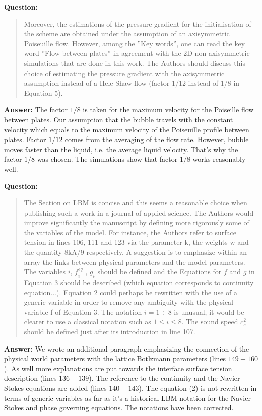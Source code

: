 \documentclass{article}
\begin{document}
\textbf{Question:}
\begin{quotation}
 Moreover, the estimations of the pressure gradient for the initialisation of the scheme are
obtained
under the assumption of an axisymmetric Poiseuille flow. However, among the ”Key words”, one can
read the key word ”Flow between plates” in agreement with the 2D non axisymmetric simulations
that are done in this work. The Authors should discuss this choice of estimating the pressure
gradient with the axisymmetric assumption instead of a Hele-Shaw flow (factor 1/12 instead of 1/8
in Equation 5).
\end{quotation}

\textbf{Answer:} The factor $1/8$ is taken for the maximum velocity for the Poiseille flow between
plates. Our assumption that the bubble travels with the constant velocity which equals to the
maximum velocity of the Poiseuille profile between plates. Factor $1/12$ comes from the averaging
of the flow rate. However, bubble moves faster than the liquid, i.e. the average liquid velocity.
That's why the factor $1/8$ was chosen. The simulations show that factor $1/8$ works reasonably
well.

\textbf{Question:}
\begin{quotation}
The Section on LBM is concise and this seems a reasonable choice when publishing such a work in a
journal of applied science. The Authors would improve signiﬁcantly the manuscript by defining more
rigorously some of the variables of the model. For instance, the Authors refer to surface tension in
lines 106, 111 and 123 via the parameter k, the weights w and the quantity 8kA/9 respectively.
A suggestion is to emphasize within an array the links between physical parameters and the model
parameters. The variables $i$, $f_i^{eq}$ , $g_i$ should be deﬁned and the Equations for $f$ and $g$
in Equation
3 should be described (which equation corresponds to continuity equation...). Equation 2 could
perhaps be rewritten with the use of a generic variable in order to remove any ambiguity with the
physical variable f of Equation 3. The notation $i = 1 \div 8$ is unusual, it would be clearer to
use a
classical notation such as $1 \leq i \leq 8$. The sound speed $c_s^2$ should be deﬁned just after
its
introduction in line 107.
\end{quotation}

\textbf{Answer:} We wrote an additional paragraph emphasizing the connection of the physical world
parameters with the lattice Botlzmann parameters (lines $149-160$). As well more explanations are
put towards the
interface surface tension description (lines $136-139$). The reference to the
continuity and the Navier-Stokes equations are added (lines $140-143$). The equation (2) is not
rewritten in terms of
generic variables as far as it's a historical LBM notation for the Navier-Stokes and phase
governing equations. The notations have been corrected.
\end{document}
